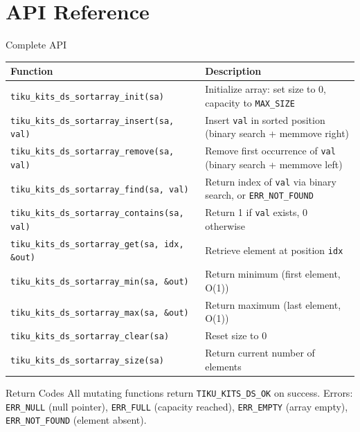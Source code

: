 \documentclass[aspectratio=169, 10pt]{beamer}
\begin{document}
\section{API Reference}

\begin{frame}[fragile]{Complete API}
\begin{table}
\centering
\small
\begin{tabular}{@{}lp{8cm}@{}}
\toprule
\textbf{Function} & \textbf{Description} \\
\midrule
\texttt{tiku\_kits\_ds\_sortarray\_init(sa)}
  & Initialize array: set size to 0, capacity to \texttt{MAX\_SIZE} \\
\texttt{tiku\_kits\_ds\_sortarray\_insert(sa, val)}
  & Insert \texttt{val} in sorted position (binary search + memmove right) \\
\texttt{tiku\_kits\_ds\_sortarray\_remove(sa, val)}
  & Remove first occurrence of \texttt{val} (binary search + memmove left) \\
\midrule
\texttt{tiku\_kits\_ds\_sortarray\_find(sa, val)}
  & Return index of \texttt{val} via binary search, or \texttt{ERR\_NOT\_FOUND} \\
\texttt{tiku\_kits\_ds\_sortarray\_contains(sa, val)}
  & Return 1 if \texttt{val} exists, 0 otherwise \\
\texttt{tiku\_kits\_ds\_sortarray\_get(sa, idx, \&out)}
  & Retrieve element at position \texttt{idx} \\
\midrule
\texttt{tiku\_kits\_ds\_sortarray\_min(sa, \&out)}
  & Return minimum (first element, O(1)) \\
\texttt{tiku\_kits\_ds\_sortarray\_max(sa, \&out)}
  & Return maximum (last element, O(1)) \\
\texttt{tiku\_kits\_ds\_sortarray\_clear(sa)}
  & Reset size to 0 \\
\texttt{tiku\_kits\_ds\_sortarray\_size(sa)}
  & Return current number of elements \\
\bottomrule
\end{tabular}
\end{table}

\vspace{0.3em}
\begin{alertblock}{Return Codes}
All mutating functions return \texttt{TIKU\_KITS\_DS\_OK} on success.
Errors: \texttt{ERR\_NULL} (null pointer), \texttt{ERR\_FULL} (capacity reached),
\texttt{ERR\_EMPTY} (array empty), \texttt{ERR\_NOT\_FOUND} (element absent).
\end{alertblock}
\end{frame}
\end{document}
